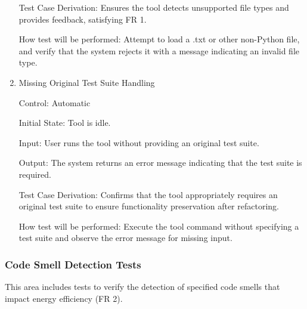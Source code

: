 \documentclass[12pt, titlepage]{article}
\begin{document}
\begin{enumerate}
Test Case Derivation: Ensures the tool detects unsupported file types and provides feedback, satisfying FR 1.

How test will be performed: Attempt to load a .txt or other non-Python file, and verify that the system rejects it with a message indicating an invalid file type.


\item{Missing Original Test Suite Handling\\}

Control: Automatic

Initial State: Tool is idle.

Input: User runs the tool without providing an original test suite.

Output: The system returns an error message indicating that the test suite is required.

Test Case Derivation: Confirms that the tool appropriately requires an original test suite to ensure functionality preservation after refactoring.

How test will be performed: Execute the tool command without specifying a test suite and observe the error message for missing input.


\end{enumerate}


\subsubsection{Code Smell Detection Tests}

This area includes tests to verify the detection of specified code 
smells that impact energy efficiency (FR 2).
		
\end{document}
